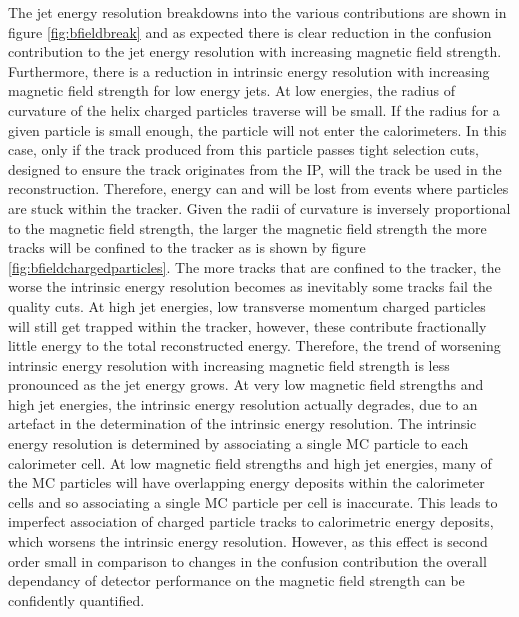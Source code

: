The jet energy resolution breakdowns into the various contributions are shown in figure \ref{fig:bfieldbreak} and as expected there is clear reduction in the confusion contribution to the jet energy resolution with increasing magnetic field strength.  Furthermore, there is a reduction in intrinsic energy resolution with increasing magnetic field strength for low energy jets.  At low energies, the radius of curvature of the helix charged particles traverse will be small.  If the radius for a given particle is small enough, the particle will not enter the calorimeters.  In this case, only if the track produced from this particle passes tight selection cuts, designed to ensure the track originates from the IP, will the track be used in the reconstruction.  Therefore, energy can and will be lost from events where particles are stuck within the tracker.  Given the radii of curvature is inversely proportional to the magnetic field strength, the larger the magnetic field strength the more tracks will be confined to the tracker as is shown by figure \ref{fig:bfieldchargedparticles}.  The more tracks that are confined to the tracker, the worse the intrinsic energy resolution becomes as inevitably some tracks fail the quality cuts.  At high jet energies, low transverse momentum charged particles will still get trapped within the tracker, however, these contribute fractionally little energy to the total reconstructed energy.  Therefore, the trend of worsening intrinsic energy resolution with increasing magnetic field strength is less pronounced as the jet energy grows.  At very low magnetic field strengths and high jet energies, the intrinsic energy resolution actually degrades, due to an artefact in the determination of the intrinsic energy resolution.  The intrinsic energy resolution is determined by associating a single MC particle to each calorimeter cell.  At low magnetic field strengths and high jet energies, many of the MC particles will have overlapping energy deposits within the calorimeter cells and so associating a single MC particle per cell is inaccurate.  This leads to imperfect association of charged particle tracks to calorimetric energy deposits, which worsens the intrinsic energy resolution.  However, as this effect is second order small in comparison to changes in the confusion contribution the overall dependancy of detector performance on the magnetic field strength can be confidently quantified.  

